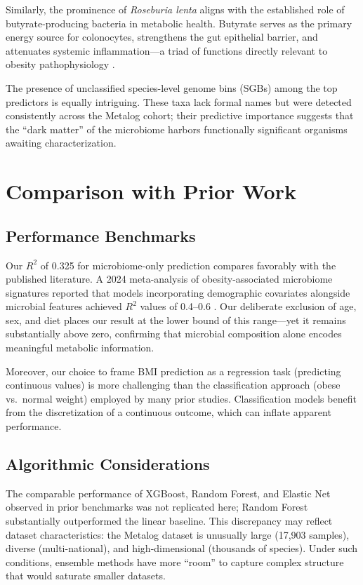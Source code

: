 Similarly, the prominence of \emph{Roseburia lenta} aligns with the established role of butyrate-producing bacteria in metabolic health. Butyrate serves as the primary energy source for colonocytes, strengthens the gut epithelial barrier, and attenuates systemic inflammation---a triad of functions directly relevant to obesity pathophysiology \cite{louis2017formation}.

The presence of unclassified species-level genome bins (SGBs) among the top predictors is equally intriguing. These taxa lack formal names but were detected consistently across the Metalog cohort; their predictive importance suggests that the ``dark matter'' of the microbiome harbors functionally significant organisms awaiting characterization.

\section{Comparison with Prior Work}

\subsection{Performance Benchmarks}

Our $R^2$ of 0.325 for microbiome-only prediction compares favorably with the published literature. A 2024 meta-analysis of obesity-associated microbiome signatures reported that models incorporating demographic covariates alongside microbial features achieved $R^2$ values of 0.4--0.6 \cite{NIHMBMI2024}. Our deliberate exclusion of age, sex, and diet places our result at the lower bound of this range---yet it remains substantially above zero, confirming that microbial composition alone encodes meaningful metabolic information.

Moreover, our choice to frame BMI prediction as a regression task (predicting continuous values) is more challenging than the classification approach (obese vs.\ normal weight) employed by many prior studies. Classification models benefit from the discretization of a continuous outcome, which can inflate apparent performance.

\subsection{Algorithmic Considerations}

The comparable performance of XGBoost, Random Forest, and Elastic Net observed in prior benchmarks \cite{topccuouglu2020framework} was not replicated here; Random Forest substantially outperformed the linear baseline. This discrepancy may reflect dataset characteristics: the Metalog dataset is unusually large (17,903 samples), diverse (multi-national), and high-dimensional (thousands of species). Under such conditions, ensemble methods have more ``room'' to capture complex structure that would saturate smaller datasets.

